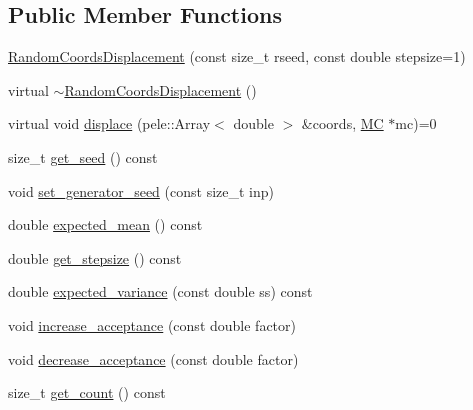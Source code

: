 \subsection*{\-Public \-Member \-Functions}
\begin{DoxyCompactItemize}
\item 
\hyperlink{classmcpele_1_1RandomCoordsDisplacement_a70c32449d74f21634737ebd382ede3aa}{\-Random\-Coords\-Displacement} (const size\-\_\-t rseed, const double stepsize=1)
\item 
virtual \hyperlink{classmcpele_1_1RandomCoordsDisplacement_a4603750d055490114b68f18b564e9fd4}{$\sim$\-Random\-Coords\-Displacement} ()
\item 
virtual void \hyperlink{classmcpele_1_1RandomCoordsDisplacement_aa6c2c40b2a36dc1711c5a7bbeeced708}{displace} (pele\-::\-Array$<$ double $>$ \&coords, \hyperlink{classmcpele_1_1MC}{\-M\-C} $\ast$mc)=0
\item 
size\-\_\-t \hyperlink{classmcpele_1_1RandomCoordsDisplacement_ac909159a4d7007b09cf5291af3415d82}{get\-\_\-seed} () const 
\item 
void \hyperlink{classmcpele_1_1RandomCoordsDisplacement_aaf9325c782ecb904a71e92671c7732fb}{set\-\_\-generator\-\_\-seed} (const size\-\_\-t inp)
\item 
double \hyperlink{classmcpele_1_1RandomCoordsDisplacement_ae8cff94bafe19a4fb529e2dbc8ac3ab1}{expected\-\_\-mean} () const 
\item 
double \hyperlink{classmcpele_1_1RandomCoordsDisplacement_a41cda87cd1b61178bc5035f9c4bcf753}{get\-\_\-stepsize} () const 
\item 
double \hyperlink{classmcpele_1_1RandomCoordsDisplacement_a77a73851c26beb001c8a48be76362a15}{expected\-\_\-variance} (const double ss) const 
\item 
void \hyperlink{classmcpele_1_1RandomCoordsDisplacement_abb8bd83d44eb248599c799f6ff76656f}{increase\-\_\-acceptance} (const double factor)
\item 
void \hyperlink{classmcpele_1_1RandomCoordsDisplacement_a75b39857737f466cee1ff4fe452d848e}{decrease\-\_\-acceptance} (const double factor)
\item 
size\-\_\-t \hyperlink{classmcpele_1_1RandomCoordsDisplacement_a37d0b36e6f3ec26e0ce3a5b5a381d661}{get\-\_\-count} () const 
\end{DoxyCompactItemize}
